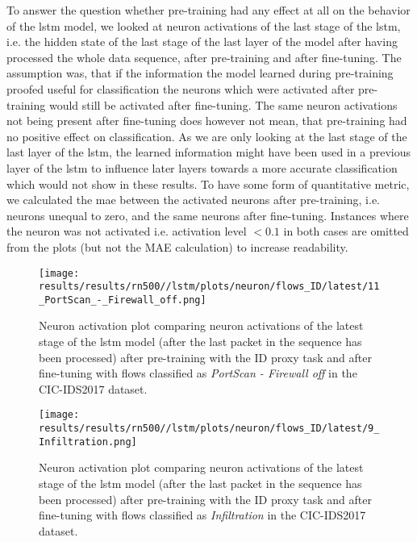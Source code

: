 To answer the question whether pre-training had any effect at all on the behavior of the \gls{lstm} model, we looked at neuron activations of the last stage of the \gls{lstm}, i.e. the hidden state of the last stage of the last layer of the model after having processed the whole data sequence, after pre-training and after fine-tuning. The assumption was, that if the information the model learned during pre-training proofed useful for classification the neurons which were activated after pre-training would still be activated after fine-tuning. The same neuron activations not being present after fine-tuning does however not mean, that pre-training had no positive effect on classification. As we are only looking at the last stage of the last layer of the \gls{lstm}, the learned information might have been used in a previous layer of the \gls{lstm} to influence later layers towards a more accurate classification which would not show in these results. To have some form of quantitative metric, we calculated the \gls{mae} between the activated neurons after pre-training, i.e. neurons unequal to zero, and the same neurons after fine-tuning. Instances where the neuron was not activated i.e. activation level $< 0.1$ in both cases are omitted from the plots (but not the MAE calculation) to increase readability.

\begin{figure}[h]
	\centering
	\texttt{[image: results/results/rn500//lstm/plots/neuron/flows\_ID/latest/11\_PortScan\_-\_Firewall\_off.png]}
	\caption{Neuron activation plot comparing neuron activations of the latest stage of the \gls{lstm} model (after the last packet in the sequence has been processed) after pre-training with the ID proxy task and after fine-tuning with flows classified as \textit{PortScan - Firewall off} in the CIC-IDS2017 dataset.}
	\label{fig:results:lstm:neuron:cic17_id_port_scan_firewall_off}
\end{figure}

\begin{figure}[h]
	\centering
	\texttt{[image: results/results/rn500//lstm/plots/neuron/flows\_ID/latest/9\_Infiltration.png]}
	\caption{Neuron activation plot comparing neuron activations of the latest stage of the \gls{lstm} model (after the last packet in the sequence has been processed) after pre-training with the ID proxy task and after fine-tuning with flows classified as \textit{Infiltration} in the CIC-IDS2017 dataset.}
	\label{fig:results:lstm:neuron:cic17_id_infiltration}
\end{figure}

